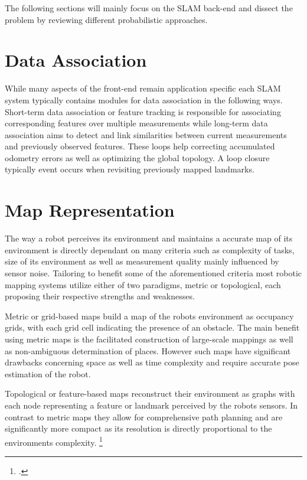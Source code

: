 The following sections will mainly focus on the SLAM back-end and dissect the problem by reviewing different probabilistic approaches. 




\section{Data Association}
While many aspects of the front-end remain application specific each SLAM system typically contains modules for data association in the following ways.
Short-term data association or feature tracking is responsible for associating corresponding features over multiple measurements while long-term data association aims to detect and link similarities between current measurements and previously observed features. These loops help correcting accumulated odometry errors as well as optimizing the global topology. 
A loop closure typically event occurs when revisiting previously mapped landmarks.

\section{Map Representation}
The way a robot perceives its environment and maintains a accurate map of its environment is directly dependant on many criteria such as complexity of tasks, size of its environment as well as measurement quality mainly influenced by sensor noise. 
Tailoring to benefit some of the aforementioned criteria most robotic mapping systems utilize either of two paradigms, metric or topological, each proposing their respective strengths and weaknesses.

Metric or grid-based maps build a map of the robots environment as occupancy grids, with each grid cell indicating the presence of an obstacle. The main benefit using metric maps is the facilitated construction of large-scale mappings as well as non-ambiguous determination of places. However such maps have significant drawbacks concerning space as well as time complexity and require accurate pose estimation of the robot.

Topological or feature-based maps reconstruct their environment as graphs with each node representing a feature or landmark perceived by the robots sensors. In contrast to metric maps they allow for comprehensive path planning and are significantly more compact as its resolution is directly proportional to the environments complexity. \footcite{thrunMaps1998}

